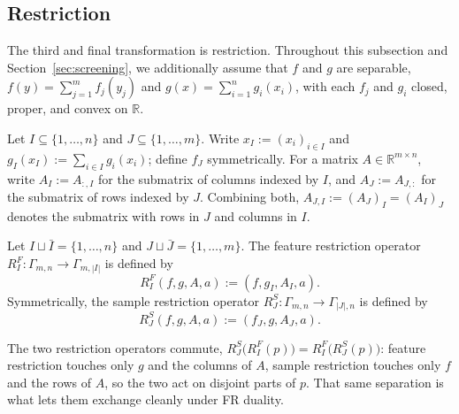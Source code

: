 
















\subsection{Restriction}

The third and final transformation is restriction. Throughout this
subsection and Section~\ref{sec:screening}, we additionally assume that \(f\) and \(g\) are separable, \(f(y)=\sum_{j=1}^m f_j(y_j)\)
and \(g(x)=\sum_{i=1}^n g_i(x_i)\), with each \(f_j\) and \(g_i\) closed, proper, and convex on \(\mathbb{R}\).

Let \(I\subseteq\{1,\ldots,n\}\) and \(J\subseteq\{1,\ldots,m\}\). Write
\(x_I:=(x_i)_{i\in I}\) and \(g_I(x_I):=\sum_{i\in I}g_i(x_i)\); define
\(f_J\) symmetrically.
For a matrix \(A\in\mathbb R^{m\times n}\), write \(A_I:=A_{:,I}\) for
the submatrix of columns indexed by \(I\), and \(A_J:=A_{J,:}\) for the
submatrix of rows indexed by \(J\). Combining both,
\(A_{J,I}:=(A_J)_I=(A_I)_J\) denotes the submatrix with rows in \(J\)
and columns in \(I\).


\begin{definition}
Let \(I\sqcup\bar I=\{1,\ldots,n\}\) and \(J\sqcup\bar J=\{1,\ldots,m\}\). The feature restriction operator \(R^{F}_I:\Gamma_{m,n}\to\Gamma_{m,|I|}\) is defined by
\[
R^{F}_I(f,g,A,a)
:=
(f,g_I,A_I,a).
\]
Symmetrically, the sample restriction operator \(R^{S}_J:\Gamma_{m,n}\to\Gamma_{|J|,n}\) is defined by
\[
R^{S}_J(f,g,A,a)
:=
(f_J,g,A_J,a).
\]
\end{definition}

The two restriction operators commute, \(R^{S}_J\bigl(R^{F}_I(p)\bigr)=R^{F}_I\bigl(R^{S}_J(p)\bigr)\):
feature restriction touches only \(g\) and the columns of \(A\), sample
restriction touches only \(f\) and the rows of \(A\), so the two act on
disjoint parts of \(p\). That same separation is what lets them
exchange cleanly under FR duality.


